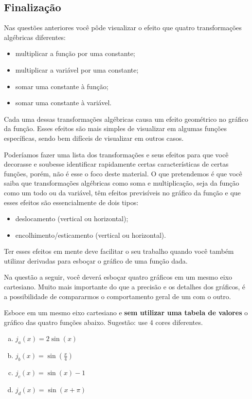 \documentclass[main_estudante.tex]{subfiles}
\begin{document}
\subsection*{Finalização}

Nas questões anteriores você pôde visualizar o efeito que quatro transformações algébricas diferentes:

\begin{itemize}
 \item multiplicar a função por uma constante;
 \item multiplicar a variável por uma constante;
 \item somar uma constante à função;
 \item somar uma constante à variável.
\end{itemize}

Cada uma dessas transformações algébricas causa um efeito geométrico no gráfico da função. Esses efeitos são mais simples de visualizar em algumas funções específicas, sendo bem difíceis de visualizar em outros casos. 

Poderíamos fazer uma lista dos transformações e seus efeitos para que você decorasse e soubesse identificar rapidamente certas características de certas funções, porém, não é esse o foco deste material. O que pretendemos é que você saiba que transformações algébricas como soma e multiplicação, seja da função como um todo ou da variável, têm efeitos previsíveis no gráfico da função e que esses efeitos são essencialmente de dois tipos:

\begin{itemize}
 \item deslocamento (vertical ou horizontal);
 \item encolhimento/esticamento (vertical ou horizontal).
\end{itemize}

Ter esses efeitos em mente deve facilitar o seu trabalho quando você também utilizar derivadas para esboçar o gráfico de uma função dada.

Na questão a seguir, você deverá esboçar quatro gráficos em um mesmo eixo cartesiano. Muito mais importante do que a precisão e os detalhes dos gráficos, é a possibilidade de compararmos o comportamento geral de um com o outro.

\begin{questao}
Esboce em um mesmo eixo cartesiano e \textbf{sem utilizar uma tabela de valores} o gráfico das quatro funções abaixo. Sugestão: use 4 cores diferentes.
\begin{enumerate}[a)]
\item $j_a (x)=2\sin(x)$
\item $j_b (x)=\sin(\frac{x}{4})$
\item $j_c (x)=\sin(x)-1$
\item $j_d (x)=\sin(x+\pi)$
\end{enumerate}
\end{questao}
\end{document}
